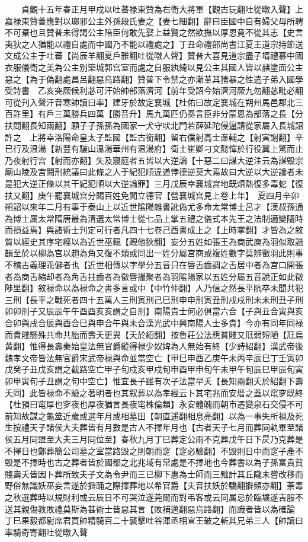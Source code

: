 　　貞觀十五年春正月甲戍以吐蕃禄東贊為右衛大將軍【觀古玩翻吐從暾入聲】上嘉禄東贊善應對以瑯邪公主外孫段氏妻之【妻七細翻】辭曰臣國中自有婦父母所聘不可棄也且贊普未得謁公主陪臣何敢先娶上益賢之然欲撫以厚恩竟不從其志【史言夷狄之人猶能以禮自處而中國乃不能以禮處之】丁丑命禮部尚書江夏王道宗持節送文成公主于吐蕃【尚辰羊翻夏戶雅翻吐從暾人聲】贊普大喜見道宗盡子壻禮慕中國衣服儀衛之美為公主别築城郭宫室而處之自服紈綺以見公主其國人皆以赭塗面公主惡之【為于偽翻處昌呂翻惡烏路翻】贊普下令禁之亦漸革其猜暴之性遣子弟入國學受詩書　乙亥突厥候利苾可汗始帥部落濟河【前年受詔今始濟河厥九勿翻苾毗必翻可從刋入聲汗音寒帥讀曰率】建牙於故定襄城【杜佑曰故定襄城在朔州馬邑郡北三百許里】有戶三萬勝兵四萬【勝音升】馬九萬匹仍奏言臣非分蒙恩為部落之長【分扶問翻長知兩翻】願子子孫孫為國家一犬守吠北門若薛延陀侵逼請從家屬入長城詔許之　上將幸洛陽命皇太子監國【監古銜翻】留右僕射高士亷輔之【射寅謝翻】辛巳行及温湯【新豐有驪山温湯華州有温湯府】衛士崔卿刁文懿憚於行役冀上驚而止乃夜射行宫【射而亦翻】矢及寢庭者五皆以大逆論【十惡二曰謀大逆注云為謀毁宗廟山陵及宫闕刑統議曰此條之人于紀犯順違道悖德逆莫大焉故曰大逆以大逆論者未是犯大逆正條以其干紀犯順以大逆論罪】三月戊辰幸襄城宫地既煩熱復多毒蛇【復扶又翻】庚午罷襄城宫分賜百姓免閻立德官【營襄城宫見上卷上年】　夏四月辛卯朔詔以來年二月有事于泰山上以近世隂陽雜書訛偽尤多命太常博士呂才【漢叔孫通為博士属太常隋唐最為清選太常博士從七品上掌五禮之儀式本先王之法制適變隨時而損益焉】與諸術士刋定可行者凡四十七卷己酉書成上之【上時掌翻】才皆為之敘質以經史其序宅經以為近世巫覡【覡他狄翻】妄分五姓如張王為商武庾為羽似取諧韻至於以柳為宫以趙為角又復不類或同出一姓分屬宫商或複姓數字莫辨徵羽此則事不稽古義理乖僻者也【近世相傳以字學分五音只在唇舌齒調之舌居中者為宫口開張者為商舌縮却者為角舌拄齒者為徵唇撮聚者為羽隂陽家以五姓分屬五音說正如此徵陟里翻】敘禄命以為禄命之書多言或中【中竹仲翻】人乃信之然長平阬卒未聞共犯三刑【長平之戰死者四十五萬人三刑寅刑己巳刑申申刑寅丑刑戍戌刑未未刑丑子刑卯卯刑子又辰辰午午酉酉亥亥謂之自刑】南陽貴士何必俱當六合【子與丑合寅與亥合卯與戌合辰與酉合巳與申合午與未合漢光武中興南陽人士多貴】今亦有同年同禄而貴賤懸殊共命共胎而壽夭更異【夭於紹翻】按魯莊公法應貧賤又尫弱短陋【尫烏黄翻】惟得長壽秦始皇法無官爵縱得禄少奴婢為人無始有終【少詩紹翻】漢武帝後魏孝文帝皆法無官爵宋武帝禄與命並當空亡【甲巳申酉乙庚午未丙辛辰巳丁壬寅卯戊癸子丑戊亥謂之截路空亡甲子旬戍亥甲戍旬申酉甲申旬午未甲午旬辰巳甲辰旬寅卯甲寅旬子丑謂之旬中空亡】惟宜長子雖有次子法當早夭【長知兩翻夭於紹翻下壽夭同】此皆禄命不驗之著明者也其叙葬以為孝經云卜其宅兆而安厝之蓋以窀穸既終【杜預曰窀厚也穸夜也厚夜猶言長夜窀株倫類】永安體魄而朝市遷變泉石交侵不可前知故謀之龜筮近歲或選年月或相墓田【朝直遥翻相息亮翻】以為一事失所禍及死生按禮天子諸侯大夫葬皆有月數是古人不擇年月也【古者天子七月而葬同軌畢至諸侯五月同盟至大夫三月同位至】春秋九月丁巳葬定公雨不克葬戊午日下昃乃克葬是不擇日也鄭葬簡公司墓之室當路毁之則朝而窆【窆必驗翻】不毁則日中而窆子產不毁是不擇時也古之葬者皆於國都之北兆域有常處是不擇地也今葬書以為子孫富貴貧賤壽夭皆因卜葬所致夫子文為令尹而三已柳下惠為士師而三黜計其丘隴未嘗改移而野俗無識妖巫妄言遂於擗踊之際擇葬地以希官爵【夫音扶妖於驕翻擗頻亦翻】荼毒之秋選葬時以規財利或云辰日不可哭泣遂莞爾而對弔客或云同属忌於臨壙遂吉服不送其親傷教敗禮莫斯為甚術士皆惡其言【敗補邁翻惡烏路翻】而識者皆以為確論　丁巳果毅都尉席君買帥精騎百二十襲擊吐谷渾丞相宣王破之斬其兄弟三人【帥讀曰率騎奇寄翻吐從暾入聲
